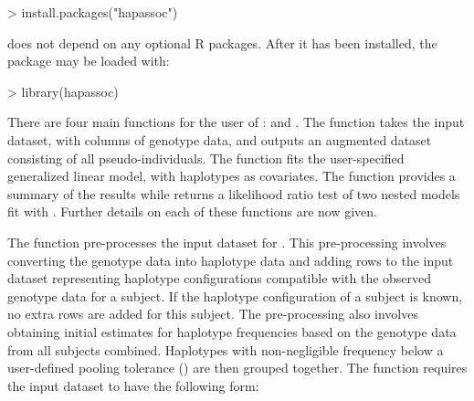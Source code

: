 \documentclass[article, shortnames]{jss}
\begin{document}
\begin{Schunk}
\begin{Sinput}
> install.packages("hapassoc")
\end{Sinput}
\end{Schunk}

 does not depend on any optional R packages. After it has 
been installed, the package may be loaded with:

\begin{Schunk}
\begin{Sinput}
> library(hapassoc)
\end{Sinput}
\end{Schunk}

There are four main functions for the user of :
and . The function
 takes the input dataset, with columns of genotype
data, and outputs an augmented dataset consisting of all
pseudo-individuals. The function  fits the 
user-specified generalized linear model, with haplotypes as covariates. 
The  function provides a summary of the results
while  returns a likelihood ratio test of two
nested models fit with .
Further details on each of these functions are now given.

The function  pre-processes the input dataset for 
. This pre-processing involves converting the genotype 
data into haplotype data and adding rows to the input dataset 
representing haplotype configurations compatible with the observed 
genotype data for a subject. If the 
haplotype configuration of a subject is known,
no extra rows are added for this subject. 
The pre-processing also involves obtaining initial estimates
for haplotype frequencies based on the genotype data
from all subjects combined.  Haplotypes with non-negligible 
frequency below a user-defined pooling
tolerance () are then grouped together.
The function requires the input dataset to have the following form:
\end{document}
